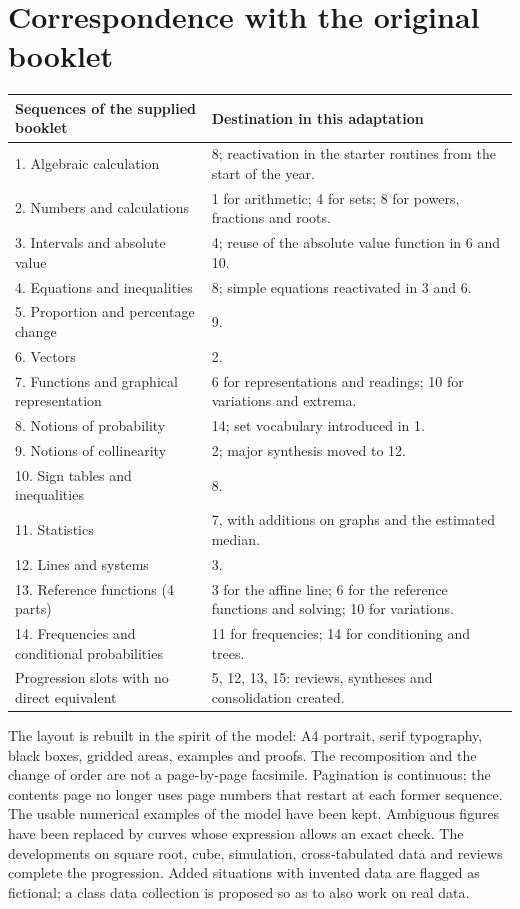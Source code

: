 \clearpage\section*{Correspondence with the original booklet}
\begin{center}\small\renewcommand{\arraystretch}{1.5}\begin{tabularx}{\linewidth}{p{6.3cm} X}
\textbf{Sequences of the supplied booklet}&\textbf{Destination in this adaptation}\\\hline
1. Algebraic calculation&8; reactivation in the starter routines from the start of the year.\\
2. Numbers and calculations&1 for arithmetic; 4 for sets; 8 for powers, fractions and roots.\\
3. Intervals and absolute value&4; reuse of the absolute value function in 6 and 10.\\
4. Equations and inequalities&8; simple equations reactivated in 3 and 6.\\
5. Proportion and percentage change&9.\\
6. Vectors&2.\\
7. Functions and graphical representation&6 for representations and readings; 10 for variations and extrema.\\
8. Notions of probability&14; set vocabulary introduced in 1.\\
9. Notions of collinearity&2; major synthesis moved to 12.\\
10. Sign tables and inequalities&8.\\
11. Statistics&7, with additions on graphs and the estimated median.\\
12. Lines and systems&3.\\
13. Reference functions (4 parts)&3 for the affine line; 6 for the reference functions and solving; 10 for variations.\\
14. Frequencies and conditional probabilities&11 for frequencies; 14 for conditioning and trees.\\\hline
Progression slots with no direct equivalent&5, 12, 13, 15: reviews, syntheses and consolidation created.
\end{tabularx}\end{center}
The layout is rebuilt in the spirit of the model: A4 portrait, serif typography, black boxes, gridded areas, examples and proofs. The recomposition and the change of order are not a page-by-page facsimile. Pagination is continuous; the contents page no longer uses page numbers that restart at each former sequence.
The usable numerical examples of the model have been kept. Ambiguous figures have been replaced by curves whose expression allows an exact check. The developments on square root, cube, simulation, cross-tabulated data and reviews complete the progression. Added situations with invented data are flagged as fictional; a class data collection is proposed so as to also work on real data.

